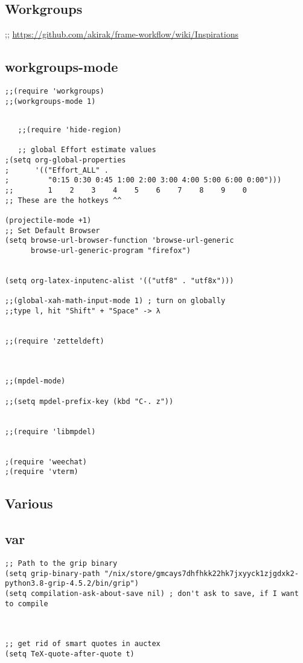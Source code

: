 \documentclass[11pt]{article}
\begin{document}
\subsection{Workgroups}
\label{sec:org6a01e56}
;; \url{https://github.com/akirak/frame-workflow/wiki/Inspirations}
\subsection{workgroups-mode}
\label{sec:org07cde0f}
\begin{verbatim}
;;(require 'workgroups)
;;(workgroups-mode 1)
\end{verbatim}

\begin{verbatim}

   ;;(require 'hide-region)

   ;; global Effort estimate values
;(setq org-global-properties
;      '(("Effort_ALL" .
;         "0:15 0:30 0:45 1:00 2:00 3:00 4:00 5:00 6:00 0:00")))
;;        1    2    3    4    5    6    7    8    9    0
;; These are the hotkeys ^^

(projectile-mode +1)
;; Set Default Browser
(setq browse-url-browser-function 'browse-url-generic
      browse-url-generic-program "firefox")


(setq org-latex-inputenc-alist '(("utf8" . "utf8x")))

;;(global-xah-math-input-mode 1) ; turn on globally
;;type l, hit "Shift" + "Space" -> λ


;;(require 'zetteldeft)



;;(mpdel-mode)

;;(setq mpdel-prefix-key (kbd "C-. z"))


;;(require 'libmpdel)


;(require 'weechat)
;(require 'vterm)

\end{verbatim}




\subsection{Various}
\label{sec:org9a25133}
\subsection{var}
\label{sec:org1c86e21}
\begin{verbatim}
;; Path to the grip binary
(setq grip-binary-path "/nix/store/gmcays7dhfhkk22hk7jxyyck1zjgdxk2-python3.8-grip-4.5.2/bin/grip")
(setq compilation-ask-about-save nil) ; don't ask to save, if I want to compile



;; get rid of smart quotes in auctex
(setq TeX-quote-after-quote t)
\end{verbatim}
\end{document}
